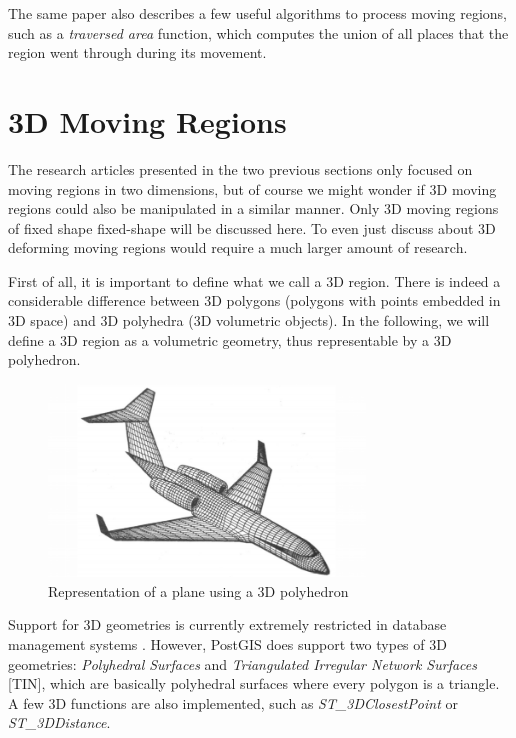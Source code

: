 The same paper \cite{fmregion} also describes a few useful algorithms to process moving regions, such as a \textit{traversed area} function, which computes the union of all places that the region went through during its movement.

\section{3D Moving Regions}
\label{section:3d_regions_intro}

The research articles presented in the two previous sections only focused on moving regions in two dimensions, but of course we might wonder if 3D moving regions could also be manipulated in a similar manner. Only 3D moving regions of fixed shape fixed-shape will be discussed here. To even just discuss about 3D deforming moving regions would require a much larger amount of research.

First of all, it is important to define what we call a 3D region. There is indeed a considerable difference between 3D polygons (polygons with points embedded in 3D space) and 3D polyhedra (3D volumetric objects). In the following, we will define a 3D region as a volumetric geometry, thus representable by a 3D polyhedron.

\begin{figure}[h!]
    \centering
    \includegraphics[width=0.75\textwidth]{images/plane_polyhedron.png}
    \caption[Representation of a plane using a 3D polyhedron]{Representation of a plane using a 3D polyhedron \cite{3d_polyhedron}}
    \label{fig:polyhedron}
\end{figure}


Support for 3D geometries is currently extremely restricted in database management systems \cite{3d_geom}. However, PostGIS does support two types of 3D geometries: \textit{Polyhedral Surfaces} and \textit{Triangulated Irregular Network Surfaces} [TIN], which are basically polyhedral surfaces where every polygon is a triangle. A few 3D functions are also implemented, such as \textit{ST\_3DClosestPoint} or \textit{ST\_3DDistance}.

